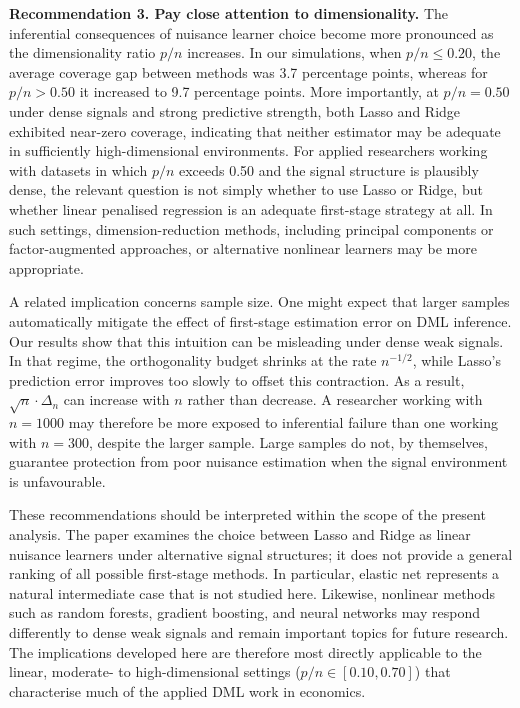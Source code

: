 \documentclass[a4paper,10.5pt]{article}
\begin{document}
\medskip
\noindent\textbf{Recommendation 3. Pay close attention to dimensionality.}
The inferential consequences of nuisance learner choice become more pronounced as the dimensionality ratio $p/n$ increases. In our simulations, when $p/n \leq 0.20$, the average coverage gap between methods was 3.7 percentage points, whereas for $p/n > 0.50$ it increased to 9.7 percentage points. More importantly, at $p/n = 0.50$ under dense signals and strong predictive strength, both Lasso and Ridge exhibited near-zero coverage, indicating that neither estimator may be adequate in sufficiently high-dimensional environments. For applied researchers working with datasets in which $p/n$ exceeds 0.50 and the signal structure is plausibly dense, the relevant question is not simply whether to use Lasso or Ridge, but whether linear penalised regression is an adequate first-stage strategy at all. In such settings, dimension-reduction methods, including principal components or factor-augmented approaches, or alternative nonlinear learners may be more appropriate.

A related implication concerns sample size. One might expect that larger samples automatically mitigate the effect of first-stage estimation error on DML inference. Our results show that this intuition can be misleading under dense weak signals. In that regime, the orthogonality budget shrinks at the rate $n^{-1/2}$, while Lasso's prediction error improves too slowly to offset this contraction. As a result, $\sqrt{n}\cdot\Delta_n$ can increase with $n$ rather than decrease. A researcher working with $n = 1000$ may therefore be more exposed to inferential failure than one working with $n = 300$, despite the larger sample. Large samples do not, by themselves, guarantee protection from poor nuisance estimation when the signal environment is unfavourable.

\medskip
These recommendations should be interpreted within the scope of the present analysis. The paper examines the choice between Lasso and Ridge as linear nuisance learners under alternative signal structures; it does not provide a general ranking of all possible first-stage methods. In particular, elastic net represents a natural intermediate case that is not studied here. Likewise, nonlinear methods such as random forests, gradient boosting, and neural networks may respond differently to dense weak signals and remain important topics for future research. The implications developed here are therefore most directly applicable to the linear, moderate- to high-dimensional settings ($p/n \in [0.10, 0.70]$) that characterise much of the applied DML work in economics.
\end{document}
